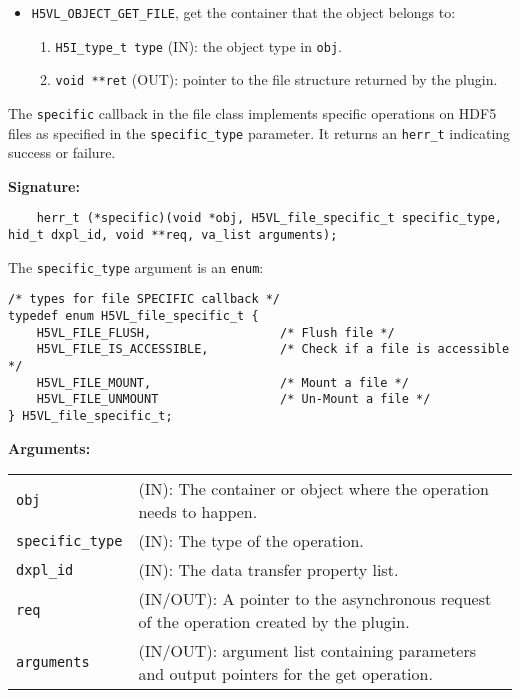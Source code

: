 \begin{mdframed}[style=bgbox]
\begin{itemize}
\item \texttt{H5VL\_OBJECT\_GET\_FILE}, get the container that the object
  belongs to:
  \begin{enumerate}
  \item \texttt{H5I\_type\_t type} (IN): the object type in \texttt{obj}.
  \item \texttt{void **ret} (OUT): pointer to the file structure returned
    by the plugin.
  \end{enumerate}
\end{itemize}
\end{mdframed}
The \texttt{specific} callback in the file class implements specific operations on HDF5 files as specified in the \texttt{specific\_type} parameter. It returns an \texttt{herr\_t} indicating success or failure.\bigskip

\begin{mdframed}[style=bgbox] 
\textbf{Signature:}
\begin{lstlisting}
    herr_t (*specific)(void *obj, H5VL_file_specific_t specific_type, hid_t dxpl_id, void **req, va_list arguments);
\end{lstlisting}

The \texttt{specific\_type} argument is an \texttt{enum}:
\begin{lstlisting}
/* types for file SPECIFIC callback */
typedef enum H5VL_file_specific_t {
    H5VL_FILE_FLUSH,                  /* Flush file */
    H5VL_FILE_IS_ACCESSIBLE,          /* Check if a file is accessible */
    H5VL_FILE_MOUNT,                  /* Mount a file */
    H5VL_FILE_UNMOUNT                 /* Un-Mount a file */
} H5VL_file_specific_t;
\end{lstlisting}

\textbf{Arguments:}\\
\begin{tabular}{l p{13.5cm}}
  \texttt{obj} & (IN): The container or object where the operation needs
  to happen.\\
  \texttt{specific\_type} & (IN): The type of the operation.\\
  \texttt{dxpl\_id} & (IN): The data transfer property list.\\
  \texttt{req} & (IN/OUT): A pointer to the asynchronous request of the
  operation created by the plugin.\\
  \texttt{arguments} & (IN/OUT): argument list containing parameters and
  output pointers for the get operation. \\
\end{tabular}


\end{mdframed}
